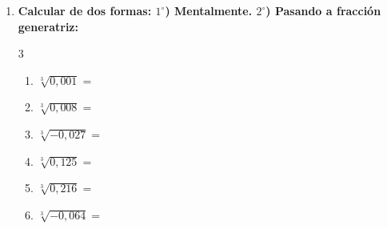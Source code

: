 \documentclass[10pt, a4paper]{article}
\begin{document}
\begin{enumerate}[start=4]
    \item \textbf{Calcular de dos formas: $1^\circ$) Mentalmente. $2^\circ$) Pasando a fracción generatriz:}
    \begin{multicol}{3}
    \begin{enumerate}[label=\alph*)]
        \item $\sqrt[3]{0,001} =$
        \item $\sqrt[3]{0,008} =$
        \item $\sqrt[3]{-0,027} =$
        \item $\sqrt[3]{0,125} =$
        \item $\sqrt[3]{0,216} =$
        \item $\sqrt[3]{-0,064} =$
    \end{enumerate}
    \end{multicol}


\end{enumerate}
\end{document}
